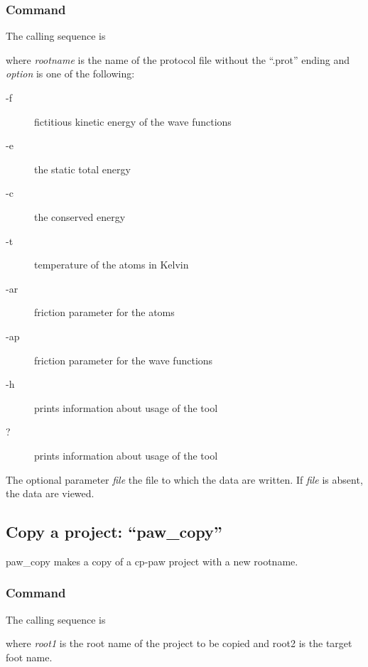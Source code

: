 \documentclass[final,12pt]{article}
\begin{document}
{{{\subsubsection{Command}

The calling sequence is

\bigskip{}\bigskip

\noindent where {\it rootname} is the name of the protocol file 
without the ``.prot'' ending and {\it option} is one of the following:
\begin{description}
\item[-f] fictitious kinetic energy of the wave functions
\item[-e] the static total energy
\item[-c] the conserved energy
\item[-t] temperature of the atoms in Kelvin
\item[-ar] friction parameter for the atoms
\item[-ap] friction parameter for the wave functions
\item[-h] prints information about usage of the tool 
\item[?] prints information about usage of the tool 
\end{description}
The optional parameter {\it file} the file to which the data are
written. If {\it file} is absent, the data are viewed.

\subsection{Copy a project: ``paw\_copy''}
paw\_copy makes a copy of a cp-paw project with a new rootname.


\subsubsection{Command}
The calling sequence is

\bigskip{}\bigskip

\noindent where {\it root1} is the root name of the project to be
copied and root2 is the target foot name.

}}}
\end{document}
